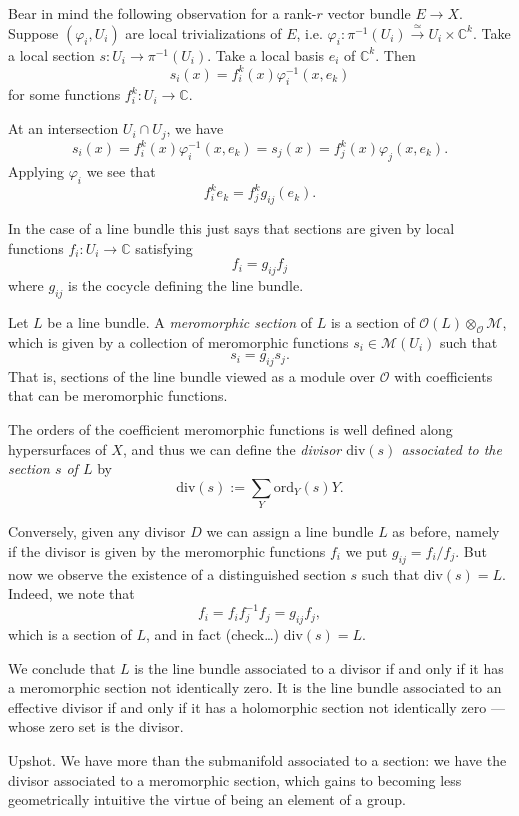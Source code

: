 Bear in mind the following observation for a
rank-$r$
vector bundle $E \to X$.
Suppose $(\varphi_i,U_i)$ are local
trivializations of $E$,
i.e. $\varphi_i:\pi^{-1}(U_i)
\xrightarrow{\simeq}U_i \times \mathbb{C}^k$.
Take a local section $s :U_i \to
\pi^{-1}(U_i)$.
Take a local basis $e_i$ of $\mathbb{C}^k$.
Then
$$
s_i(x)=f_i^k(x)\varphi_i^{-1}(x,e_k)
$$
for some functions $f_i^k:U_i \to
\mathbb{C}$.

At an intersection $U_i \cap U_j$,
we have
$$
s_i(x)=f_i^k(x)\varphi_i^{-1}(x,e_k)
=
s_j(x)=f_j^k(x)\varphi_j(x,e_k).
$$
Applying $\varphi_i$ we see that
$$
f_i^k e_k = f_j^k g_{ij}(e_k).
$$

In the case of a line bundle this just says
that sections
are given by local functions $f_i:U_i \to
\mathbb{C}$ satisfying
$$
f_i=g_{ij}f_j
$$
where $g_{ij}$ is the cocycle defining the
line bundle.

Let $L$ be a line bundle.
A {\it meromorphic section} of $L$ is a
section
of $\mathcal{O}(L)
\otimes_\mathcal{O}\mathcal{M}$,
which is given by a collection of meromorphic
functions
$s_i \in \mathcal{M}(U_i)$
such that
$$
s_i=g_{ij}s_j.
$$
That is, sections of the line bundle viewed
as a module over $\mathcal{O}$
with coefficients that can be meromorphic
functions.

The orders of the coefficient meromorphic
functions
is well defined along hypersurfaces of $X$,
and thus
we can define the
{\it divisor $\text{div}(s)$ associated to
the section $s$ of $L$}
by
$$
\text{div}(s)
:= \sum_Y\text{ord}_Y(s)Y.
$$

Conversely, given any divisor $D$
we can assign a line bundle $L$ as before,
namely if the divisor is given by the
meromorphic functions $f_i$
we put $g_{ij}=f_i/f_j$.
But now we observe
the existence of a distinguished section $s$
such that $\text{div}(s)=L$.
Indeed, we note that
$$
f_i=f_if_j^{-1}f_j=g_{ij}f_j,
$$
which is a section of $L$,
and in fact (check…) $\text{div}(s)=L$.

We conclude that $L$ is the line bundle
associated to a divisor
if and only if it has a meromorphic section
not identically zero.
It is the line bundle associated to an
effective divisor
if and only if it has a holomorphic section
not identically zero
--- whose zero set is the divisor.

\medskip\noindent
Upshot. We have more than the submanifold
associated to a section:
we have the divisor associated to a
meromorphic section,
which gains to becoming less geometrically
intuitive
the virtue of being an element of a group.


